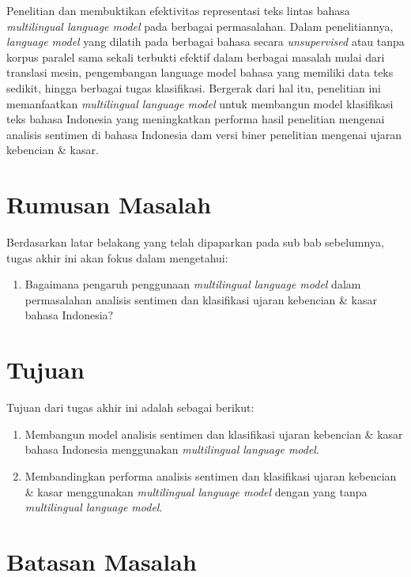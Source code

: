 Penelitian \parencite{Devlin_Chang_Lee_Toutanova_2019} dan \parencite{LampleConneau2019} membuktikan efektivitas representasi teks lintas bahasa \textit{multilingual language model} pada berbagai permasalahan. Dalam penelitiannya, \textit{language model} yang dilatih pada berbagai bahasa secara \textit{unsupervised} atau tanpa korpus paralel sama sekali terbukti efektif dalam berbagai masalah mulai dari translasi mesin, pengembangan language model bahasa yang memiliki data teks sedikit, hingga berbagai tugas klasifikasi. Bergerak dari hal itu, penelitian ini memanfaatkan \textit{multilingual language model} untuk membangun model klasifikasi teks bahasa Indonesia yang meningkatkan performa hasil penelitian \parencite{CrisdayantiPurwarianti2019} mengenai analisis sentimen di bahasa Indonesia dam versi biner penelitian \parencite{Ibrohim_Budi_2019} mengenai ujaran kebencian \& kasar. 

\section{Rumusan Masalah}

Berdasarkan latar belakang yang telah dipaparkan pada sub bab sebelumnya, tugas akhir ini akan fokus dalam mengetahui: 
\begin{enumerate}
	\item Bagaimana pengaruh penggunaan \textit{multilingual language model} dalam permasalahan analisis sentimen dan klasifikasi ujaran kebencian \& kasar bahasa Indonesia?
\end{enumerate}

\section{Tujuan}

Tujuan dari tugas akhir ini adalah sebagai berikut:
\begin{enumerate}
	\item Membangun model analisis sentimen dan klasifikasi ujaran kebencian \& kasar bahasa Indonesia menggunakan \textit{multilingual language model}.
	\item Membandingkan performa analisis sentimen dan klasifikasi ujaran kebencian \& kasar menggunakan \textit{multilingual language model} dengan yang tanpa \textit{multilingual language model}.
\end{enumerate}

\section{Batasan Masalah}

